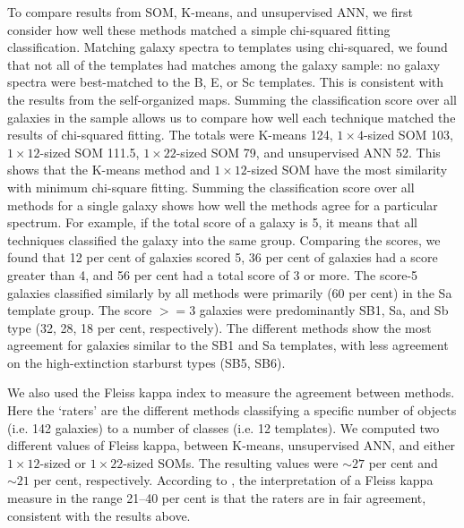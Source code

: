        To compare results from SOM, K-means, and unsupervised ANN, we first consider how well these methods matched a simple chi-squared fitting classification. 
        Matching galaxy spectra to templates using chi-squared, we found that not all of the templates had matches among the galaxy sample: no galaxy spectra were best-matched to the B, E, or Sc templates. 
        This is consistent with the results from the self-organized maps.
        Summing the classification score over all galaxies in the sample allows us to compare how well each technique matched the results of chi-squared fitting.
        The totals were K-means 124, $1\times4$-sized SOM 103, $1\times12$-sized SOM 111.5, $1\times22$-sized SOM 79, and unsupervised ANN 52.
        This shows that the K-means method and $1\times12$-sized SOM have the most similarity with minimum chi-square fitting.
        Summing the classification score over all methods for a single galaxy shows how well the methods agree for a particular spectrum.
        For example, if the total score of a galaxy is 5, it means that all techniques classified the galaxy into the same group.
        Comparing the scores, we found that 12 per cent of galaxies scored 5, 36 per cent of galaxies had a score greater than 4, and 56 per cent had a total score of 3 or more.
        The score-5 galaxies classified similarly by all methods were primarily (60 per cent) in the Sa template group. 
        The score $>=3$ galaxies were predominantly SB1, Sa, and Sb type (32, 28, 18 per cent, respectively).
        The different methods show the most agreement for galaxies similar to the SB1 and Sa templates, with less agreement on the high-extinction starburst types (SB5, SB6).
           
        
       We also used the Fleiss kappa index \citet{landis77} to 
        measure the agreement between methods. 
        Here the `raters' are the different methods classifying a specific number of objects (i.e. 142 galaxies) to a number of classes (i.e. 12 templates).
        We computed two different values of Fleiss kappa, between  K-means, unsupervised ANN, and either 
         $1\times12$-sized or $1\times22$-sized SOMs.
        The resulting values were $\sim 27$ per cent and $\sim 21$ per cent, respectively.
        According to \citet{landis77}, the interpretation of a Fleiss kappa measure in the range 21--40 per cent is that the raters are in fair agreement, consistent with the results above. 

